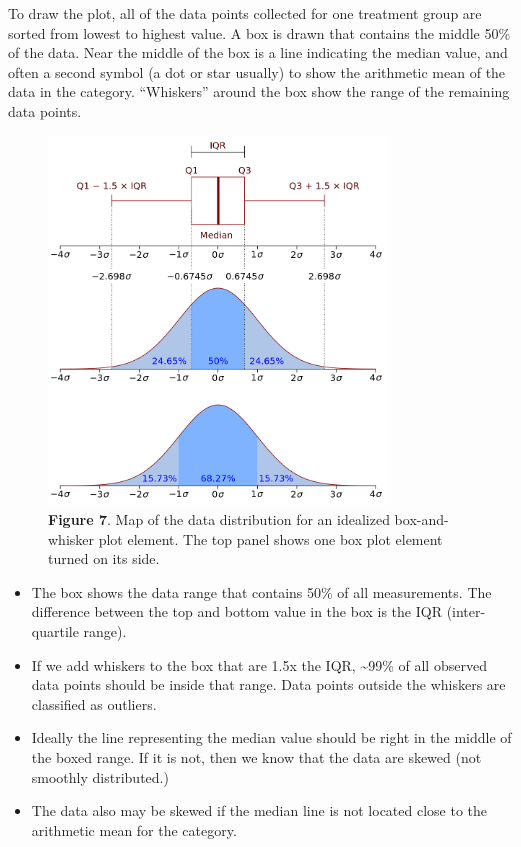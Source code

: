 \documentclass[
]{book}
\providecommand{\tightlist}{%
  \setlength{\itemsep}{0pt}\setlength{\parskip}{0pt}}
\begin{document}
To draw the plot, all of the data points collected for one treatment group are sorted from lowest to highest value. A box is drawn that contains the middle 50\% of the data. Near the middle of the box is a line indicating the median value, and often a second symbol (a dot or star usually) to show the arithmetic mean of the data in the category. ``Whiskers'' around the box show the range of the remaining data points.

\begin{figure}
\centering
\includegraphics[width=0.8\textwidth,height=\textheight]{images/Boxplot_dist.png}
\caption{\textbf{Figure 7}. Map of the data distribution for an idealized box-and-whisker plot element. The top panel shows one box plot element turned on its side.}
\end{figure}

\begin{itemize}
\tightlist
\item
  The box shows the data range that contains 50\% of all measurements. The difference between the top and bottom value in the box is the IQR (inter-quartile range).
\item
  If we add whiskers to the box that are 1.5x the IQR, \textasciitilde99\% of all observed data points should be inside that range. Data points outside the whiskers are classified as outliers.
\item
  Ideally the line representing the median value should be right in the middle of the boxed range. If it is not, then we know that the data are skewed (not smoothly distributed.)
\item
  The data also may be skewed if the median line is not located close to the arithmetic mean for the category.
\end{itemize}
\end{document}
